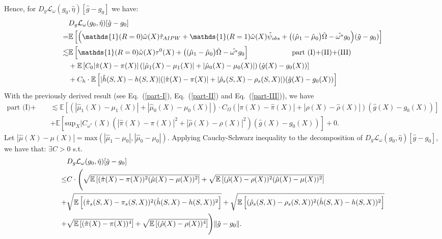 \documentclass{article}
\theoremstyle{plain}
\theoremstyle{definition}
\theoremstyle{remark}
\newcommand{\E}{\mathbb{E}}                %
\newcommand{\1}{\mathds{1}}                %
\begin{document}
Hence, for $D_g\mathcal{L}_\omega(g_0, \hat{\eta})[\hat{g}-g_0]$ we have:
\begin{align}
    & D_g\mathcal{L}_\omega(g_0, \hat{\eta})[\hat{g}-g_0] \notag \\
   =& \E\left[ \Bigl(\1(R=0) \hat{\omega}(X) \hat{\tau}_{AIPW} + \1(R=1) \hat{\omega}(X) \hat\psi_{obs} + \big( (\hat\mu_1-\hat\mu_0\big) \hat{\Omega} - \hat{\omega^*}g_0\Bigr)(\hat{g} - g_0)\right] \\
   \lesssim& \E\left[ \1(R=0) \hat{\omega}(X) \tau^0(X)  + \big( (\hat\mu_1-\hat\mu_0\big) \hat{\Omega} - \hat{\omega^*}g_0 \right] \text{\qquad \qquad \qquad part (I)+(II)+(III)} \notag \\ 
   &+\E\left[C_0|\hat{\pi}(X)-\pi(X)|\left(|\hat\mu_1(X)-\mu_1(X)|+|\hat\mu_0(X)-\mu_0(X)| \right)(\hat{g}(X) - g_0(X))\right]  \notag \\
   &+ C_h\cdot\E\left[|\hat{h}(S,X) - h(S,X)| (|\hat\pi(X) - \pi(X)| + |\hat\rho_s(S,X) - \rho_s(S,X)|) (\hat{g}(X) - g_0(X))\right]
\end{align}
With the previously derived result (see Eq.~(\ref{part-I}), Eq.~(\ref{part-II}) and Eq.~(\ref{part-III})), we have
\begin{align}
    \text{part (I)+(II)+(III)} &\lesssim \E\left[\left( |\hat\mu_1(X) - \mu_1(X)| + |\hat\mu_0(X) - \mu_0(X)| \right) 
\cdot C_\Omega \left(|\pi(X) - \hat\pi(X)| + |\rho(X) - \hat\rho(X)|\right)(\hat{g}(X)-g_0(X))\right] \\
& + \E\left[\text{sup}_{X}|C_{\omega^*}(X) \left(|\hat{\pi}(X)-\pi(X)|^2 + |\hat{\rho}(X)-\rho(X)|^2\right)(\hat{g}(X)-g_0(X))\right] + 0.
\end{align}
Let $|\hat\mu(X)-\mu(X)|=\text{max}(|\hat\mu_1-\mu_0|, |\hat\mu_0-\mu_0|)$. Applying Cauchy-Schwarz inequality to the decomposition of $D_g\mathcal{L}_\omega(g_0, \hat{\eta})[\hat{g}-g_0]$, we have that: $\exists C>0$ s.t.
\begin{align}
    & D_g\mathcal{L}_\omega(g_0, \hat{\eta})[\hat{g}-g_0] \\
    \leq& C\cdot\Biggl(\sqrt{\E\left[(\hat\pi(X) - \pi(X))^2 (\hat\mu(X) - \mu(X))^2\right]}  + \sqrt{\E\left[(\hat\rho(X) - \rho(X))^2 (\hat\mu(X) - \mu(X))^2\right]} \notag \\
     + &\sqrt{\E\left[(\hat\pi_s(S,X) - \pi_s(S,X))^2 (\hat{h}(S,X) - h(S,X))^2\right]}  +\sqrt{\E\left[(\hat\rho_s(S,X) - \rho_s(S,X))^2 (\hat{h}(S,X) - h(S,X))^2\right]} \\
     + & \sqrt{\E\left[(\hat\pi(X) - \pi(X))^4 \right]} + \sqrt{\E\left[(\hat\rho(X) - \rho(X))^4 \right]}
    \Biggr)\|\hat{g}-g_0\|.
\end{align}
\end{document}

